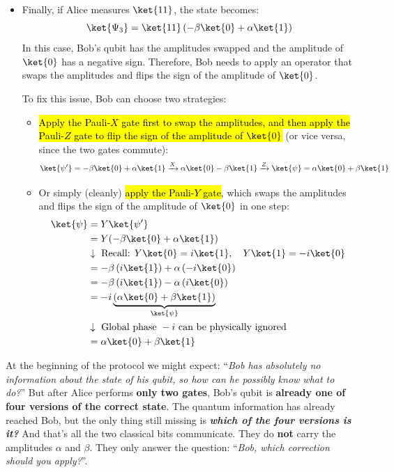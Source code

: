 \begin{itemize}
    \item Finally, if Alice measures $\ket{11}$, the state becomes:
    \begin{equation*}
        \ket{\Psi_3} = \ket{11}\left(-\beta\ket{0} + \alpha\ket{1}\right)
    \end{equation*}
    In this case, Bob's qubit has the amplitudes swapped and the amplitude of $\ket{0}$ has a negative sign. Therefore, Bob needs to apply an operator that swaps the amplitudes and flips the sign of the amplitude of $\ket{0}$.

    To fix this issue, Bob can choose two strategies:
    \begin{itemize}
        \item \hl{Apply the Pauli-$X$ gate first to swap the amplitudes, and then apply the Pauli-$Z$ gate to flip the sign of the amplitude of $\ket{0}$} (or vice versa, since the two gates commute):
        \begin{equation*}
            \ket{\psi'} = -\beta\ket{0} + \alpha\ket{1} \xrightarrow{X} \alpha\ket{0} - \beta\ket{1} \xrightarrow{Z} \ket{\psi} = \alpha\ket{0} + \beta\ket{1}
        \end{equation*}

        \item Or simply (cleanly) \hl{apply the Pauli-$Y$ gate}, which swaps the amplitudes and flips the sign of the amplitude of $\ket{0}$ in one step:
        \begin{align*}
            \ket{\psi} &= Y\ket{\psi'} \\
            &= Y(-\beta\ket{0} + \alpha\ket{1}) \\
            &\downarrow \text{ Recall: } Y\ket{0} = i\ket{1}, \quad Y\ket{1} = -i\ket{0} \\
            &= -\beta\left(i\ket{1}\right) + \alpha\left(-i\ket{0}\right) \\
            &= -\beta\left(i\ket{1}\right) - \alpha\left(i\ket{0}\right) \\
            &= -i \underbrace{\left(\alpha\ket{0} + \beta\ket{1}\right)}_{\ket{\psi}} \\
            &\downarrow \text{ Global phase } -i \text{ can be physically ignored} \\
            &= \alpha\ket{0} + \beta\ket{1}
        \end{align*}
    \end{itemize}
\end{itemize}
At the beginning of the protocol we might expect: ``\emph{Bob has absolutely no information about the state of his qubit, so how can he possibly know what to do?}'' But after Alice performs \textbf{only two gates}, Bob's qubit is \textbf{already one of four versions of the correct state}. The quantum information has already reached Bob, but the only thing still missing is \emph{\textbf{which of the four versions is it?}} And that's all the two classical bits communicate. They do \textbf{not} carry the amplitudes $\alpha$ and $\beta$. They only answer the question: ``\emph{Bob, which correction should you apply?}''.